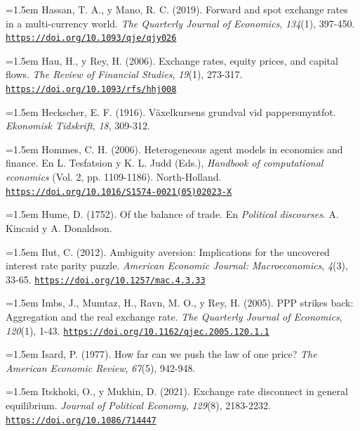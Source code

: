 \documentclass[10pt,a4paper]{article}
\begin{document}
\noindent\hangindent=1.5em Hassan, T. A., y Mano, R. C. (2019). Forward and spot exchange rates in a multi-currency world. \textit{The Quarterly Journal of Economics}, \textit{134}(1), 397-450. \href{https://doi.org/10.1093/qje/qjy026}{\nolinkurl{https://doi.org/10.1093/qje/qjy026}}

\noindent\hangindent=1.5em Hau, H., y Rey, H. (2006). Exchange rates, equity prices, and capital flows. \textit{The Review of Financial Studies}, \textit{19}(1), 273-317. \href{https://doi.org/10.1093/rfs/hhj008}{\nolinkurl{https://doi.org/10.1093/rfs/hhj008}}

\noindent\hangindent=1.5em Heckscher, E. F. (1916). Växelkursens grundval vid pappersmyntfot. \textit{Ekonomisk Tidskrift}, \textit{18}, 309-312.

\begin{sloppypar}\noindent\hangindent=1.5em Hommes, C. H. (2006). Heterogeneous agent models in economics and finance. En L. Tesfatsion y K. L. Judd (Eds.), \textit{Handbook of computational economics} (Vol. 2, pp. 1109-1186). North-Holland. \href{https://doi.org/10.1016/S1574-0021(05)02023-X}{\nolinkurl{https://doi.org/10.1016/S1574-0021(05)02023-X}}\end{sloppypar}

\noindent\hangindent=1.5em Hume, D. (1752). Of the balance of trade. En \textit{Political discourses}. A. Kincaid y A. Donaldson.

\noindent\hangindent=1.5em Ilut, C. (2012). Ambiguity aversion: Implications for the uncovered interest rate parity puzzle. \textit{American Economic Journal: Macroeconomics}, \textit{4}(3), 33-65. \href{https://doi.org/10.1257/mac.4.3.33}{\nolinkurl{https://doi.org/10.1257/mac.4.3.33}}

\noindent\hangindent=1.5em Imbs, J., Mumtaz, H., Ravn, M. O., y Rey, H. (2005). PPP strikes back: Aggregation and the real exchange rate. \textit{The Quarterly Journal of Economics}, \textit{120}(1), 1-43. \href{https://doi.org/10.1162/qjec.2005.120.1.1}{\nolinkurl{https://doi.org/10.1162/qjec.2005.120.1.1}}

\noindent\hangindent=1.5em Isard, P. (1977). How far can we push the law of one price? \textit{The American Economic Review}, \textit{67}(5), 942-948.

\noindent\hangindent=1.5em Itskhoki, O., y Mukhin, D. (2021). Exchange rate disconnect in general equilibrium. \textit{Journal of Political Economy}, \textit{129}(8), 2183-2232. \href{https://doi.org/10.1086/714447}{\nolinkurl{https://doi.org/10.1086/714447}}
\end{document}
